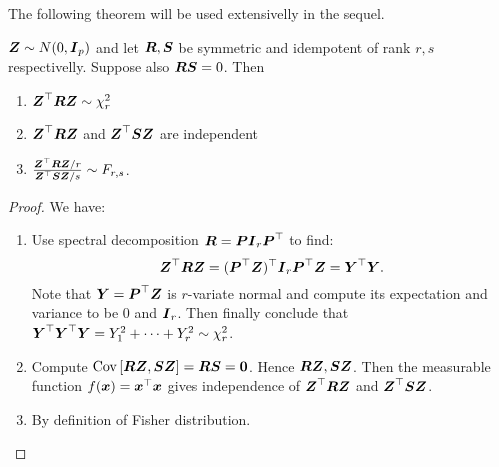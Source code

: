 The following theorem will be used extensivelly in the sequel. 
\begin{theorem}
    $\boldsymbol{Z}\sim N(0, \boldsymbol{I}_p)$ and let $\boldsymbol{R}, \boldsymbol{S}$ be symmetric and idempotent of rank $r, s$ respectivelly. Suppose also $\boldsymbol{RS}=0$. Then 
    \begin{enumerate}
        \item $\boldsymbol{Z}^\top \boldsymbol{R} \boldsymbol{Z} \sim \chi^2_r$
        \item $\boldsymbol{Z}^\top \boldsymbol{R} \boldsymbol{Z}$ and $\boldsymbol{Z}^\top \boldsymbol{S} \boldsymbol{Z}$ are independent
        \item $\frac{\boldsymbol{Z}^\top \boldsymbol{R} \boldsymbol{Z} / r}{\boldsymbol{Z}^\top \boldsymbol{S} \boldsymbol{Z}/s} \sim F_{r,s}$.
    \end{enumerate}
\end{theorem}
\begin{proof} We have:
    \begin{enumerate}
        \item Use spectral decomposition $\boldsymbol{R} = \boldsymbol{P}\boldsymbol{I}_r \boldsymbol{P}^\top$ to find:
        $$
            \boldsymbol{Z}^\top\boldsymbol{R}\boldsymbol{Z} 
            = (\boldsymbol{P}^\top\boldsymbol{Z})^\top \boldsymbol{I}_r \boldsymbol{P}^\top\boldsymbol{Z}
            = \boldsymbol{Y}^\top \boldsymbol{Y}.
        $$
        Note that $\boldsymbol{Y}=\boldsymbol{P}^\top\boldsymbol{Z}$ is $r$-variate normal and compute its expectation and variance to be $0$ and $\boldsymbol{I}_r$. Then finally conclude that $\boldsymbol{Y}^\top \boldsymbol{Y}^\top\boldsymbol{Y}=Y_1^2+\dots+Y_r^2\sim\chi^2_r$.
        \item Compute $\mathrm{Cov}\left[\boldsymbol{R}\boldsymbol{Z}, \boldsymbol{S}\boldsymbol{Z}\right] = \boldsymbol{R}\boldsymbol{S} = \boldsymbol{0}$. Hence $\boldsymbol{R}\boldsymbol{Z}, \boldsymbol{S}\boldsymbol{Z}$. Then the measurable function $f(\boldsymbol{x})=\boldsymbol{x}^\top \boldsymbol{x}$ gives independence of $\boldsymbol{Z}^\top \boldsymbol{R} \boldsymbol{Z}$ and $\boldsymbol{Z}^\top \boldsymbol{S} \boldsymbol{Z}$.
        \item By definition of Fisher distribution.
    \end{enumerate}
\end{proof}


